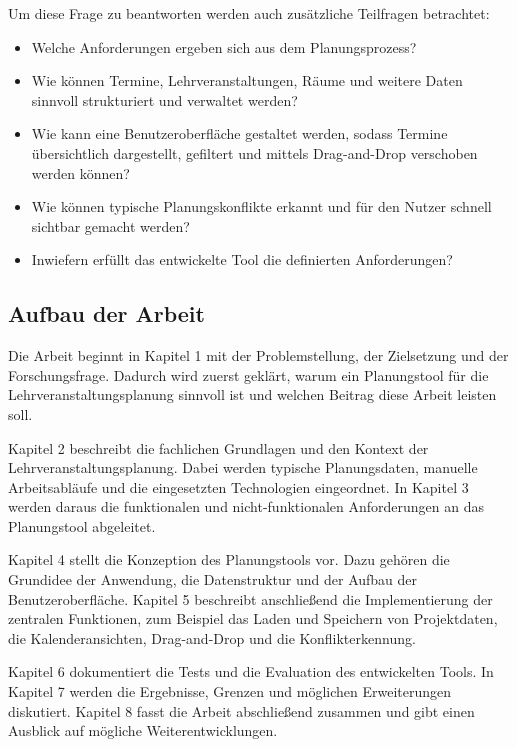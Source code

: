 \documentclass[12pt,a4paper]{article}
\begin{document}
Um diese Frage zu beantworten werden auch zusätzliche Teilfragen betrachtet:

\begin{itemize}
    \item Welche Anforderungen ergeben sich aus dem Planungsprozess?
    \item Wie können Termine, Lehrveranstaltungen, Räume und weitere Daten sinnvoll strukturiert und verwaltet werden?
    \item Wie kann eine Benutzeroberfläche gestaltet werden, sodass Termine übersichtlich dargestellt, gefiltert und mittels Drag-and-Drop verschoben werden können?
    \item Wie können typische Planungskonflikte erkannt und für den Nutzer schnell sichtbar gemacht werden?
    \item Inwiefern erfüllt das entwickelte Tool die definierten Anforderungen?
\end{itemize}

\subsection{Aufbau der Arbeit}

Die Arbeit beginnt in Kapitel 1 mit der Problemstellung, der Zielsetzung und der Forschungsfrage. Dadurch wird zuerst geklärt, warum ein Planungstool für die Lehrveranstaltungsplanung sinnvoll ist und welchen Beitrag diese Arbeit leisten soll.

Kapitel 2 beschreibt die fachlichen Grundlagen und den Kontext der Lehrveranstaltungsplanung. Dabei werden typische Planungsdaten, manuelle Arbeitsabläufe und die eingesetzten Technologien eingeordnet. In Kapitel 3 werden daraus die funktionalen und nicht-funktionalen Anforderungen an das Planungstool abgeleitet.

Kapitel 4 stellt die Konzeption des Planungstools vor. Dazu gehören die Grundidee der Anwendung, die Datenstruktur und der Aufbau der Benutzeroberfläche. Kapitel 5 beschreibt anschließend die Implementierung der zentralen Funktionen, zum Beispiel das Laden und Speichern von Projektdaten, die Kalenderansichten, Drag-and-Drop und die Konflikterkennung.

Kapitel 6 dokumentiert die Tests und die Evaluation des entwickelten Tools. In Kapitel 7 werden die Ergebnisse, Grenzen und möglichen Erweiterungen diskutiert. Kapitel 8 fasst die Arbeit abschließend zusammen und gibt einen Ausblick auf mögliche Weiterentwicklungen.

\clearpage
\end{document}
